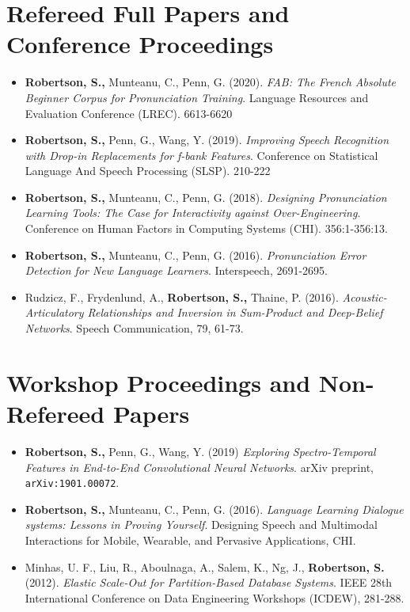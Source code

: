 \documentclass{article}
\begin{document}
\section{Refereed Full Papers and Conference Proceedings}
\begin{itemize}
  \item \textbf{Robertson, S.,} Munteanu, C., Penn, G. (2020).
    \textit{FAB: The French Absolute Beginner Corpus for Pronunciation
    Training}. Language Resources and Evaluation Conference (LREC). 6613-6620

  \item \textbf{Robertson, S.,} Penn, G., Wang, Y. (2019).
    \textit{Improving Speech Recognition with Drop-in Replacements for f-bank
    Features}. Conference on Statistical Language And Speech Processing
    (SLSP). 210-222

  \item \textbf{Robertson, S.,} Munteanu, C., Penn, G. (2018).
    \textit{Designing Pronunciation Learning Tools: The Case for Interactivity
    against Over-Engineering}. Conference on Human Factors in Computing Systems
    (CHI). 356:1-356:13.

  \item \textbf{Robertson, S.,} Munteanu, C., Penn, G. (2016).
    \textit{Pronunciation Error Detection for New Language Learners}.
    Interspeech, 2691-2695.

  \item Rudzicz, F., Frydenlund, A., \textbf{Robertson, S.,} Thaine, P. (2016).
    \textit{Acoustic-Articulatory Relationships and Inversion in Sum-Product
    and Deep-Belief Networks}. Speech Communication, 79, 61-73.
\end{itemize}

\section{Workshop Proceedings and Non-Refereed Papers}
\begin{itemize}
  \item \textbf{Robertson, S.,} Penn, G., Wang, Y. (2019) \textit{Exploring
    Spectro-Temporal Features in End-to-End Convolutional Neural Networks}.
    arXiv preprint, \texttt{arXiv:1901.00072}.

  \item \textbf{Robertson, S.,} Munteanu, C., Penn, G. (2016).
    \textit{Language Learning Dialogue systems: Lessons in Proving Yourself}.
    Designing Speech and Multimodal Interactions for Mobile, Wearable, and
    Pervasive Applications, CHI.

  \item Minhas, U. F., Liu, R., Aboulnaga, A., Salem, K., Ng, J.,
    \textbf{Robertson, S.} (2012). \textit{Elastic Scale-Out for
    Partition-Based Database Systems}. IEEE 28th International Conference on
    Data Engineering Workshops (ICDEW), 281-288.
\end{itemize}
\end{document}
